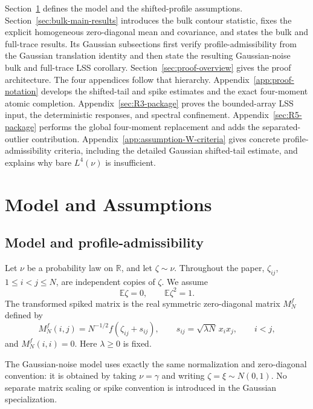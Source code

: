 \documentclass[11pt]{article}
\theoremstyle{definition}
\theoremstyle{remark}
\newcommand{\E}{\mathbb E}
\newcommand{\R}{\mathbb R}
\begin{document}
Section~\ref{sec:model-main} defines the model and the shifted-profile
assumptions.  Section~\ref{sec:bulk-main-results} introduces the bulk contour
statistic, fixes the explicit homogeneous zero-diagonal mean and covariance,
and states the bulk and full-trace results.  Its Gaussian
subsections first verify profile-admissibility from the Gaussian translation
identity and then state the resulting Gaussian-noise bulk and full-trace LSS
corollary.  Section~\ref{sec:proof-overview} gives the proof architecture.
The four appendices follow that hierarchy.  Appendix~\ref{app:proof-notation}
develops the shifted-tail and spike estimates and the exact four-moment atomic
completion.  Appendix~\ref{sec:R3-package} proves the bounded-array LSS input,
the deterministic responses, and spectral confinement.
Appendix~\ref{sec:R5-package} performs the global four-moment replacement and
adds the separated-outlier contribution.
Appendix~\ref{app:assumption-W-criteria} gives concrete
profile-admissibility criteria, including the detailed Gaussian shifted-tail
estimate, and explains why bare $L^4(\nu)$ is insufficient.
\section{Model and Assumptions}\label{sec:model-main}

\subsection{Model and profile-admissibility}

Let \(\nu\) be a probability law on \(\R\), and let \(\zeta\sim\nu\).  Throughout the paper, \(\zeta_{ij}\), \(1\le i<j\le N\), are independent copies of \(\zeta\).  We assume
\[
        \E\zeta=0,
        \qquad
        \E\zeta^2=1.
\]
The transformed spiked matrix is the real symmetric zero-diagonal matrix \(M_N^f\) defined by
\begin{equation}\label{eq:model}
        M_N^f(i,j)=N^{-1/2}f(\zeta_{ij}+s_{ij}),
        \qquad
        s_{ij}=\sqrt{\lambda N}\,x_i x_j,
        \qquad i<j,
\end{equation}
and \(M_N^f(i,i)=0\).  Here \(\lambda\ge0\) is fixed.

The Gaussian-noise model uses exactly the same normalization and zero-diagonal
convention: it is obtained by taking \(\nu=\gamma\) and writing
\(\zeta=\xi\sim N(0,1)\).  No separate matrix scaling or spike convention is
introduced in the Gaussian specialization.
\end{document}
